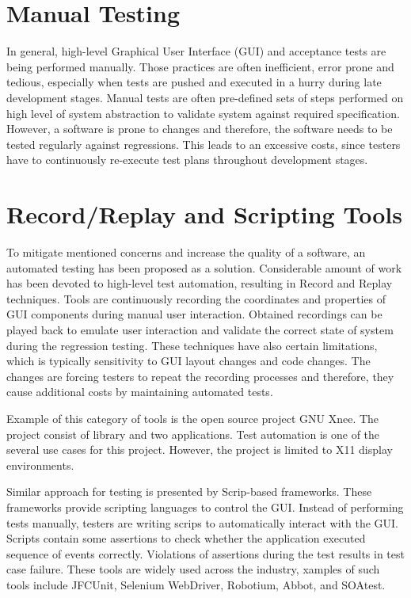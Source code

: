 \section{Manual Testing}
In general, high-level Graphical User Interface (GUI) and acceptance tests are being performed manually. Those practices are often inefficient, error prone and tedious, especially when tests are pushed and executed in a hurry during late development stages. Manual tests are often pre-defined sets of steps performed on high level of system abstraction to validate system against required specification. However, a software is prone to changes and therefore, the software needs to be tested regularly against regressions. This leads to an excessive costs, since testers have to continuously re-execute test plans throughout development stages.\cite{guitesting}

\section{Record/Replay and Scripting Tools}
To mitigate mentioned concerns and increase the quality of a software, an automated testing has been proposed as a solution. Considerable amount of work has been devoted to high-level test automation, resulting in Record and Replay techniques. Tools are  continuously recording the coordinates and properties of GUI components during manual user interaction. Obtained recordings can be played back to emulate user interaction and validate the correct state of system during the regression testing. These techniques have also certain limitations, which is typically sensitivity to GUI layout changes and code changes. The changes are forcing testers to repeat the recording processes and therefore, they cause additional costs by maintaining automated tests.\cite{guitesting} 

Example of this category of tools is the open source project GNU Xnee. The project consist of library and two applications. Test automation is one of the several use cases for this project. However, the project is limited to X11 display environments.\cite{xnee}

Similar approach for testing is presented by Scrip-based frameworks. These frameworks provide scripting languages to control the GUI. Instead of performing tests manually, testers are writing scrips to automatically interact with the GUI. Scripts contain some assertions to check whether the application executed sequence of events correctly. Violations of assertions during the test results in test case failure. These tools are widely used across the industry, xamples of such tools include JFCUnit, Selenium WebDriver, Robotium, Abbot, and SOAtest.\cite{NguyenBao2014Gait}

